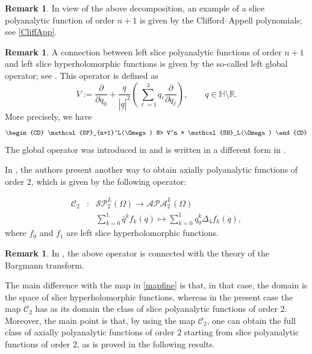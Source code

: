 \documentclass[reqno,11pt]{amsart}
\numberwithin{equation}{section}
\theoremstyle{definition}
\newtheorem{remark}[theorem]{{\bf Remark}}
\begin{document}
\begin{remark}
	In view of the above decomposition, an example of a slice polyanalytic function of order $n+1$ is given by the Clifford--Appell polynomials; see \eqref{CliffApp}.
\end{remark}


\begin{remark}
	\label{Global}
	A connection between left slice polyanalytic functions of order $n+1$ and left slice hyperholomorphic functions is given by the so-called left global operator; see \cite{ADS1}. This operator is defined as
	$$
	V := \frac{\partial}{\partial q_0} + \frac{\underline{q}}{|\underline{q}|^2}\left( \sum_{\ell=1}^3 q_\ell \frac{\partial}{\partial q_\ell}\right), \qquad q \in \mathbb{H} \setminus \mathbb{R}.
	$$
	More precisely, we have
	$$
	\begin{CD}
		\mathcal{SP}_{n+1}^L(\Omega) @> V^n >> \mathcal{SH}_L(\Omega)
	\end{CD}
	$$
	The global operator was introduced in \cite{CGS} and is written in a different form in \cite{GP}.
\end{remark}


In \cite{ADS1}, the authors present another way to obtain axially polyanalytic functions of order $2$, which is given by the following operator:

\begin{eqnarray}
	\label{polyope}
	\mathcal{C}_2&:& \mathcal{SP}_2^L(\Omega) \to \mathcal{APA}_2^L(\Omega)\\
	\nonumber
	&& \sum_{k=0}^{1} \bar{q}^k f_k(q) \mapsto \sum_{k=0}^{1} q_0^k \Delta_4 f_k(q),
\end{eqnarray}
where $f_0$ and $f_1$ are left slice hyperholomorphic functions.

\begin{remark}
In \cite{DK3}, the above operator is connected with the theory of the Bargmann transform.
\end{remark}


The main difference with the map in \eqref{mapfine} is that, in that case, the domain is the space of slice hyperholomorphic functions, whereas in the present case the map $\mathcal{C}_2$ has as its domain the class of slice polyanalytic functions of order $2$. Moreover, the main point is that, by using the map $\mathcal{C}_2$, one can obtain the full class of axially polyanalytic functions of order $2$ starting from slice polyanalytic functions of order $2$, as is proved in the following results.
\end{document}
